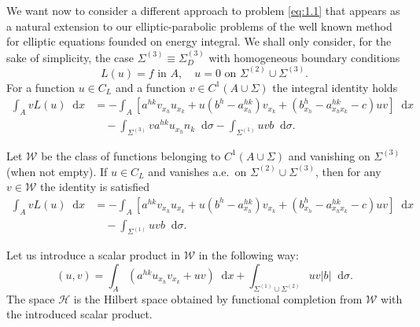 \documentclass[a4paper,12pt,leqno]{article}
\numberwithin{equation}{section}
\newcommand{\dd}{\mathop{}\!\mathrm{d}}
\begin{document}
We want now to consider a different approach to problem \eqref{eq:1.1} that appears as a natural extension to our elliptic-parabolic problems of the well known method for elliptic equations founded on energy integral. We shall only consider, for the sake of simplicity, the case $\Sigma^{(3)} \equiv \Sigma_{D}^{(3)}$ with homogeneous boundary conditions
\begin{equation} \label{eq:1.1_0}
	\tag{$1.1_0$}
	L(u) = f
	\text{ in } A, 
	\quad 
	u=0 \text{ on } \Sigma^{(2)} \cup \Sigma^{(3)}.
\end{equation}
For a function $u \in C_{L}$ and a function $v \in C^{1}(A \cup \Sigma)$ the integral identity holds
\begin{equation*}
	\begin{split}
		\int_{A} v L(u) \dd x
		& = -\int_{A}\left[a^{h k} v_{x_{h}} u_{x_{k}}+u\left(b^{h}-a_{x_{h}}^{h k}\right) v_{x_{k}}+\left(b_{x_{h}}^{h}-a^{h k}_{x_h x_k}-c\right) u v\right] \dd x \\
		& \quad -\int_{\Sigma^{(3)}} v a^{h k} u_{x_{h}}{n_{k}} \dd \sigma
		-\int_{\Sigma^{(1)}} u v b \dd \sigma.
	\end{split}
\end{equation*}

Let $\mathscr{W}$ be the class of functions belonging to $C^{1}(A \cup \Sigma)$ and vanishing on $\Sigma^{(3)}$ (when not empty). If $u \in C_{L}$ and vanishes a.e.\ on $\Sigma^{(2)} \cup \Sigma^{(3)}$, then for any $v \in \mathscr{W}$ the identity is satisfied
\begin{equation*}
	\begin{split}
		\int_{A} v L(u) \dd x
		& = -\int_{A}\left[a^{h k} v_{x_{h}} u_{x_{k}}+u\left(b^{h}-a_{x_{h}}^{h k}\right) v_{x_{k}}+\left(b_{x_{h}}^{h}-a^{h k}_{x_h x_k}-c\right) u v\right] \dd x \\
		& \quad -\int_{\Sigma^{(1)}} u v b \dd \sigma.
	\end{split}
\end{equation*}

Let us introduce a scalar product in $\mathscr{W}$ in the following way: \begin{equation*}
	(u, v)=\int_{A}\left(a^{h k} u_{x_{h}} v_{x_{k}}+u v\right) \dd x+\int_{\Sigma^{(1)} \cup {\Sigma}^{(2)}} u v|b| \dd \sigma . 
\end{equation*} 
The space $\mathscr{H}$ is the Hilbert space obtained by functional completion from $\mathscr{W}$ with the introduced scalar product. 
\end{document}
